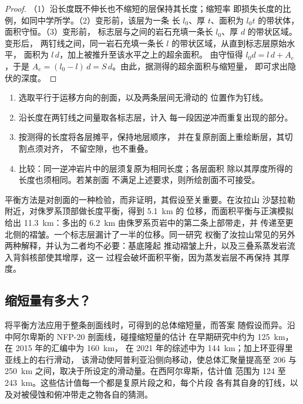 \begin{proof}
（1）沿长度既不伸长也不缩短的层保持其长度；缩短率
即损失长度的比例，如同中学所学。（2）变形前，该层为一条
长 $l_0$、厚 $t$、面积为 $l_0 t$ 的带状体，面积守恒。（3）变形前，
标志层与之间的岩石充填一条长 $l_0$、厚 $d$ 的带状区域。变形后，
两钉线之间，同一岩石充填一条长 $l$ 的带状区域，从直到标志层原始水平，
面积为 $l\,d$，加上被推升至该水平之上的超余面积。
由守恒得 $l_0 d = l\,d + A_e$，于是 $A_e = (l_0 -
l)\,d = S\,d$。由此，据测得的超余面积与缩短量，
即可求出隐伏的深度。
\end{proof}


\begin{method}[剖面的复原]\label{met:b2:alpine-orogen:restore}
\begin{enumerate}
\item 选取平行于运移方向的剖面，以及两条层间无滑动的
位置作为钉线。
\item 沿长度在两钉线之间量取各标志层，计入
每一段因逆冲而重复出现的部分。
\item 按测得的长度将各层摊平，保持地层顺序，
并在复原剖面上重绘断层，其切割点须对齐，
不留空隙，也不重叠。
\item 比较：同一逆冲岩片中的层须复原为相同长度；各层面积
除以其厚度所得的长度也须相同。若某剖面
不满足上述要求，则所绘剖面不可接受。
\end{enumerate}
\end{method}

平衡方法是对剖面的一种检验，而非证明，其假设至关重要。在汝拉山
沙瑟拉勒附近，对侏罗系顶部做长度平衡，得到 \qty{5.1}{km} 的
位移，而面积平衡与正演模拟给出 \qty{11.3}{km}：多出的
\qty{6.2}{km} 由侏罗系页岩中的第二条上部带走，并
传递至更北侧的褶皱。一个标志层漏计了一半的位移。同一研究
权衡了汝拉山常见的另外两种解释，并认为二者均不必要：基底隆起
推动褶皱上升，以及三叠系蒸发岩流入背斜核部使其增厚，这一
过程会破坏面积平衡，因为蒸发岩层不再保持
其厚度。

\subsection*{缩短量有多大？}

将平衡方法应用于整条剖面线时，可得到的总体缩短量，而答案
随假设而异。沿中阿尔卑斯的 NFP-20 剖面线，碰撞缩短量的估计
在早期研究中约为 \qty{125}{km}，在 2015 年的汇编中为 \qty{160}{km}，
在 2021 年的综述中为 \qty{144}{km}；加上环亚得里亚线上的右行滑动，
该滑动使阿普利亚沿侧向移动，使总体汇聚量提高至 206 与
\qty{250}{km} 之间，取决于所设定的滑动量。在西阿尔卑斯，估计值
范围为 124 至 \qty{243}{km}。这些估计值每一个都是复原片段之和，每个片段
各有其自身的钉线，以及对被侵蚀和俯冲带走之物各自的猜测。

